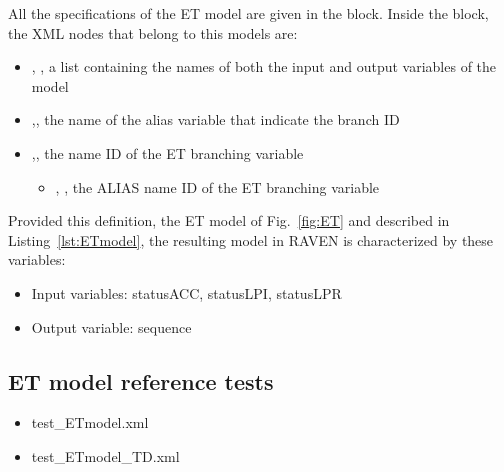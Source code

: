 All the specifications of the ET model are given in the 
 block. 
Inside the  block, the XML
nodes that belong to this models are:
\begin{itemize}
  \item  {}, , a list containing the names of both the input and output variables of the model
  \item  {},, the name of the alias variable that indicate the branch ID
  \item  {},, the name ID of the ET branching variable
	  \begin{itemize}
	    \item {}, , the ALIAS name ID of the ET branching variable
	  \end{itemize}
\end{itemize}

Provided this definition, the ET model of Fig.~\ref{fig:ET} and described in Listing~\ref{lst:ETmodel}, 
the resulting model in RAVEN is characterized by these variables:
\begin{itemize}
	\item Input variables: statusACC, statusLPI, statusLPR
	\item Output variable: sequence
\end{itemize}

\subsection{ET model reference tests}
\begin{itemize}
	\item test\_ETmodel.xml
	\item test\_ETmodel\_TD.xml
\end{itemize}




